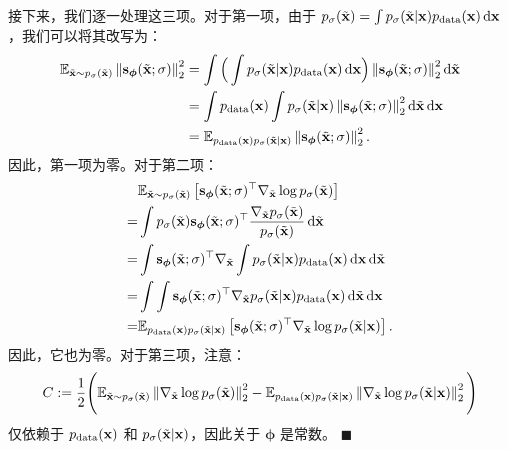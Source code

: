 接下来，我们逐一处理这三项。对于第一项，由于 $p_\sigma(\tilde{{\mathbf{x}}}) = \int p_{\sigma}(\tilde{{\mathbf{x}}} | {\mathbf{x}}) p_{\text{data}}({\mathbf{x}}) \mathop{}\!\mathrm{d}{\mathbf{x}}$，我们可以将其改写为：
\begin{align*}
    \mathbb{E}_{\tilde{{\mathbf{x}}} \sim p_\sigma(\tilde{{\mathbf{x}}})} \left\lVert{\mathbf{s}}_{\bm{\phi}}(\tilde{{\mathbf{x}}}; \sigma)\right\rVert_2^2 
    &= \int \Big( \int p_{\sigma}(\tilde{{\mathbf{x}}} | {\mathbf{x}}) p_{\text{data}}({\mathbf{x}})  \mathop{}\!\mathrm{d}{\mathbf{x}} \Big) \left\lVert{\mathbf{s}}_{\bm{\phi}}(\tilde{{\mathbf{x}}}; \sigma)\right\rVert_2^2 \mathop{}\!\mathrm{d} \tilde{{\mathbf{x}}} 
    \\ &= \int p_{\text{data}}({\mathbf{x}}) \int p_{\sigma}(\tilde{{\mathbf{x}}} | {\mathbf{x}}) \left\lVert{\mathbf{s}}_{\bm{\phi}}(\tilde{{\mathbf{x}}}; \sigma)\right\rVert_2^2 \mathop{}\!\mathrm{d} \tilde{{\mathbf{x}}} \mathop{}\!\mathrm{d}{\mathbf{x}}
    \\ &= \mathbb{E}_{ p_{\text{data}}({\mathbf{x}})p_{\sigma}(\tilde{{\mathbf{x}}} | {\mathbf{x}})} \left\lVert{\mathbf{s}}_{\bm{\phi}}(\tilde{{\mathbf{x}}}; \sigma)\right\rVert_2^2.
\end{align*}
因此，第一项为零。对于第二项：
\begin{align}\label{eq:dsm-sec-term}
\begin{aligned}
          &\mathbb{E}_{\tilde{{\mathbf{x}}} \sim p_\sigma(\tilde{{\mathbf{x}}})}\left[ {\mathbf{s}}_{\bm{\phi}}(\tilde{{\mathbf{x}}}; \sigma)^\top  \nabla_{\tilde{{\mathbf{x}}}} \log p_\sigma(\tilde{{\mathbf{x}}}) \right] 
      \\=&\int  p_\sigma(\tilde{{\mathbf{x}}}) {\mathbf{s}}_{\bm{\phi}}(\tilde{{\mathbf{x}}}; \sigma)^\top  \frac{\nabla_{\tilde{{\mathbf{x}}}} p_\sigma(\tilde{{\mathbf{x}}})}{p_\sigma(\tilde{{\mathbf{x}}})}  \mathop{}\!\mathrm{d}\tilde{{\mathbf{x}}}
        \\=&\int   {\mathbf{s}}_{\bm{\phi}}(\tilde{{\mathbf{x}}}; \sigma)^\top  \nabla_{\tilde{{\mathbf{x}}}} \int p_{\sigma}(\tilde{{\mathbf{x}}} | {\mathbf{x}}) p_{\text{data}}({\mathbf{x}}) \mathop{}\!\mathrm{d}{\mathbf{x}} \mathop{}\!\mathrm{d}\tilde{{\mathbf{x}}}
    \\=&\int \int  {\mathbf{s}}_{\bm{\phi}}(\tilde{{\mathbf{x}}}; \sigma)^\top    \nabla_{\tilde{{\mathbf{x}}}}p_{\sigma}(\tilde{{\mathbf{x}}} | {\mathbf{x}}) p_{\text{data}}({\mathbf{x}}) \mathop{}\!\mathrm{d}\tilde{{\mathbf{x}}} \mathop{}\!\mathrm{d}{\mathbf{x}} 
      \\=  &\mathbb{E}_{ p_{\text{data}}({\mathbf{x}})p_{\sigma}(\tilde{{\mathbf{x}}} | {\mathbf{x}})}\left[ {\mathbf{s}}_{\bm{\phi}}(\tilde{{\mathbf{x}}}; \sigma)^\top  \nabla_{\tilde{{\mathbf{x}}}} \log p_\sigma(\tilde{{\mathbf{x}}}| {\mathbf{x}})\right].
\end{aligned}
\end{align}
因此，它也为零。对于第三项，注意：
\[
C:=\frac{1}{2}\Bigg(\mathbb{E}_{\tilde{{\mathbf{x}}} \sim p_\sigma(\tilde{{\mathbf{x}}})}  \left\lVert\nabla_{\tilde{{\mathbf{x}}}} \log p_\sigma(\tilde{{\mathbf{x}}})\right\rVert_2^2  -  \mathbb{E}_{ p_{\text{data}}({\mathbf{x}})p_{\sigma}(\tilde{{\mathbf{x}}} | {\mathbf{x}})} \left\lVert\nabla_{\tilde{{\mathbf{x}}}} \log p_{\sigma}(\tilde{{\mathbf{x}}} | {\mathbf{x}})\right\rVert_2^2   \Bigg)
\]
仅依赖于 $p_{\text{data}}({\mathbf{x}})$ 和 $p_{\sigma}(\tilde{{\mathbf{x}}}|{\mathbf{x}})$，因此关于 $\bm{\phi}$ 是常数。
\hfill$\blacksquare$

